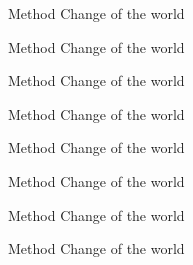 \documentclass[avery5371,backs,frame]{flashcards} %
\begin{document}
\begin{flashcard}{Method}
	Change of the world
\end{flashcard}
\begin{flashcard}{Method}
	Change of the world
\end{flashcard}
\begin{flashcard}{Method}
	Change of the world
\end{flashcard}
\begin{flashcard}{Method}
	Change of the world
\end{flashcard}
\begin{flashcard}{Method}
	Change of the world
\end{flashcard}
\begin{flashcard}{Method}
	Change of the world
\end{flashcard}
\begin{flashcard}{Method}
	Change of the world
\end{flashcard}
\begin{flashcard}{Method}
	Change of the world
\end{flashcard}
\end{document}
